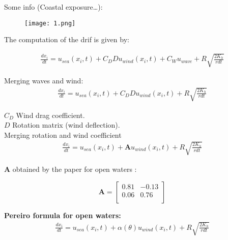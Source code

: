 \documentclass[a4paper,12pt]{article}
\begin{document}
\small
Some info (Coastal exposure\dots):
\begin{figure}[h]
    \centering
    \texttt{[image: 1.png]}
    \caption{ }
    \label{fig:mobile1}
\end{figure}


The computation of the drif is given by:

\begin{equation}
\begin{split}
\frac{dx_i}{dt} = u_{sea}(x_i, t) + C_D D u_{wind}(x_i,t) + C_W u_{wave} + R \sqrt{\frac{2K_h}{r dt}} 
\end{split}
\end{equation}

Merging waves and wind: \\
\begin{equation}
\begin{split}
\frac{dx_i}{dt} = u_{sea}(x_i, t) + C_D D u_{wind}(x_i,t) + R \sqrt{\frac{2K_h}{r dt}} 
\end{split}
\end{equation}

$C_D$ Wind drag coefficient. \\
$D$ Rotation matrix (wind deflection).\\

Merging rotation and wind coefficient
\begin{equation}
\begin{split}
\frac{dx_i}{dt} = u_{sea}(x_i, t) + \pmb{A}u_{wind}(x_i,t) + R \sqrt{\frac{2K_h}{r dt}} 
\end{split}
\end{equation}

$\pmb{A}$ obtained by the paper for open waters : 

\begin{equation}
\pmb{A} = 
    \begin{bmatrix}
        0.81 & -0.13 \\
        0.06 & 0.76 \\
    \end{bmatrix}
\end{equation}

\textbf{Pereiro formula for open waters:}
\begin{equation}
\begin{split}
\frac{dx_i}{dt} = u_{sea}(x_i, t) + \alpha(\theta) u_{wind}(x_i,t) + R \sqrt{\frac{2K_h}{r dt}} 
\end{split}
\end{equation}
\end{document}
